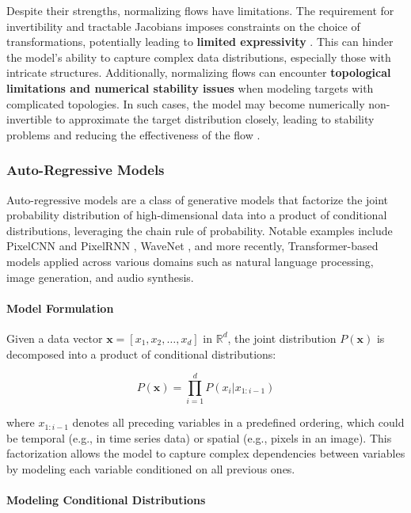 Despite their strengths, normalizing flows have limitations. The requirement for invertibility and tractable Jacobians imposes constraints on the choice of transformations, potentially leading to \textbf{limited expressivity} \cite{papamakarios2019normalizing}. This can hinder the model's ability to capture complex data distributions, especially those with intricate structures. Additionally, normalizing flows can encounter \textbf{topological limitations and numerical stability issues} when modeling targets with complicated topologies. In such cases, the model may become numerically non-invertible to approximate the target distribution closely, leading to stability problems and reducing the effectiveness of the flow \cite{behrmann2021understanding, cornish2020relaxing}.

\subsubsection{Auto-Regressive Models}\label{sec:auto_regressive_models}

Auto-regressive models are a class of generative models that factorize the joint probability distribution of high-dimensional data into a product of conditional distributions, leveraging the chain rule of probability. Notable examples include PixelCNN and PixelRNN \cite{oord2016pixel}, WaveNet \cite{vanwavenet2016}, and more recently, Transformer-based models \cite{vaswani2017attention} applied across various domains such as natural language processing, image generation, and audio synthesis.

\paragraph{Model Formulation}

Given a data vector \( \mathbf{x} = [x_1, x_2, \dots, x_d] \) in \( \mathbb{R}^d \), the joint distribution \( P(\mathbf{x}) \) is decomposed into a product of conditional distributions:

\[
P(\mathbf{x}) = \prod_{i=1}^{d} P(x_i | x_{1:i-1})
\]

where \( x_{1:i-1} \) denotes all preceding variables in a predefined ordering, which could be temporal (e.g., in time series data) or spatial (e.g., pixels in an image). This factorization allows the model to capture complex dependencies between variables by modeling each variable conditioned on all previous ones.

\paragraph{Modeling Conditional Distributions}

